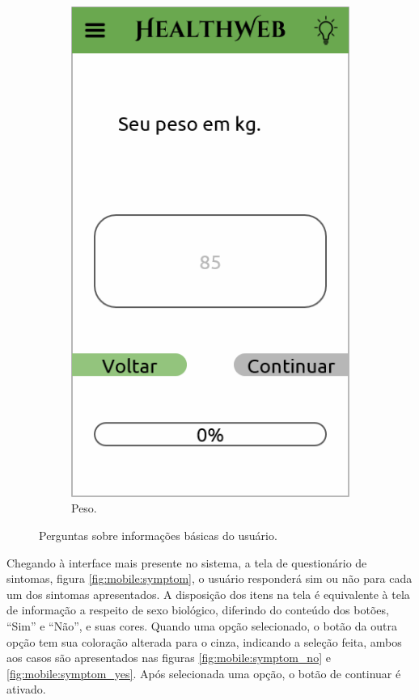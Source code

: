 \begin{figure}[htbp]
\begin{subfigure}{0.24\linewidth}
		\includegraphics[width=\linewidth]{figure/prototype/mobile/weight.png}
		\caption{Peso.}
		\label{fig:mobile:weight}
	\end{subfigure}
	\caption{Perguntas sobre informações básicas do usuário.}
	\label{fig:mobile:bio_sex_age_height_weight}
\end{figure}

Chegando à interface mais presente no sistema, a tela de questionário de sintomas, figura \ref{fig:mobile:symptom}, o usuário responderá sim ou não para cada um dos sintomas apresentados. A disposição dos itens na tela é equivalente à tela de informação a respeito de sexo biológico, diferindo do conteúdo dos botões, ``Sim'' e ``Não'', e suas cores.
Quando uma opção selecionado, o botão da outra opção tem sua coloração alterada para o cinza, indicando a seleção feita, ambos aos casos são apresentados nas figuras \ref{fig:mobile:symptom_no} e \ref{fig:mobile:symptom_yes}. Após selecionada uma opção, o botão de continuar é ativado.

